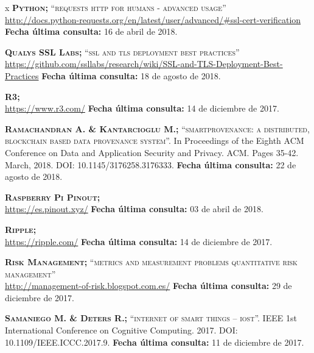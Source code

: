 \begin{thebibliography} {x}
	 \textsc{\textbf{Python; }}\textsc{“requests http for humans - advanced usage”} \\ 
	\url{http://docs.python-requests.org/en/latest/user/advanced/#ssl-cert-verification}
	\newline \textbf{Fecha última consulta:} 16 de abril de 2018.
	
	 \textsc{\textbf{Qualys SSL Labs; }}\textsc{“ssl and tls deployment best practices”} \\
	\url{https://github.com/ssllabs/research/wiki/SSL-and-TLS-Deployment-Best-Practices}
	\newline \textbf{Fecha última consulta:} 18 de agosto de 2018.
		
	 \textsc{\textbf{R3; }} \\
	\url{https://www.r3.com/}
	\newline \textbf{Fecha última consulta:} 14 de diciembre de 2017.
		
	 \textsc{\textbf{Ramachandran A. \& Kantarcioglu M.; }} \textsc{“smartprovenance: a distributed, blockchain based data provenance system”.} In Proceedings of the Eighth ACM Conference on Data and Application Security and Privacy. ACM. Pages 35-42. March, 2018. DOI: 10.1145/3176258.3176333.
	\newline \textbf{Fecha última consulta:} 22 de agosto de 2018.
	
	 \textsc{\textbf{Raspberry Pi Pinout; }} \\ 
	\url{https://es.pinout.xyz/}
	\newline \textbf{Fecha última consulta:} 03 de abril de 2018.
	
	 \textsc{\textbf{Ripple; }} \\
	\url{https://ripple.com/}
	\newline \textbf{Fecha última consulta:} 14 de diciembre de 2017.
	
	 \textsc{\textbf{Risk Management; }}\textsc{“metrics and measurement problems quantitative risk management”} \\
	\url{http://management-of-risk.blogspot.com.es/}
	\newline \textbf{Fecha última consulta:} 29 de diciembre de 2017.
				
	 \textsc{\textbf{Samaniego M. \& Deters R.; }} \textsc{“internet of smart things – iost”.} IEEE 1st International Conference on Cognitive Computing. 2017. DOI: 10.1109/IEEE.ICCC.2017.9.	
	\newline \textbf{Fecha última consulta:} 11 de diciembre de 2017.
	

\end{thebibliography}
